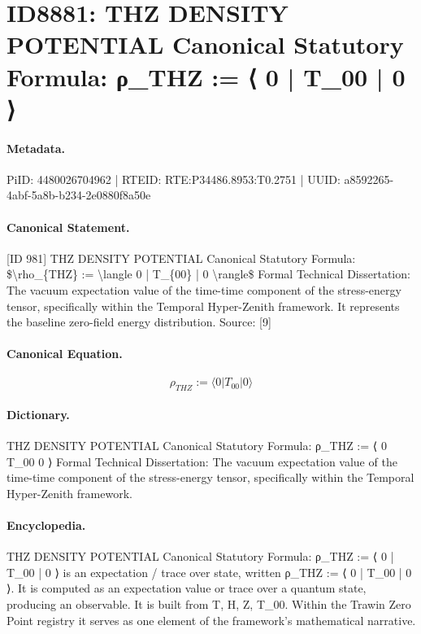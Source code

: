 \section*{ID8881: THZ DENSITY POTENTIAL Canonical Statutory Formula: ρ\_THZ := ⟨ 0 | T\_00 | 0 ⟩}
\paragraph{Metadata.}
PiID: 4480026704962 | RTEID: RTE:P34486.8953:T0.2751 | UUID: a8592265-4abf-5a8b-b234-2e0880f8a50e

\paragraph{Canonical Statement.}
[ID 981] THZ DENSITY POTENTIAL Canonical Statutory Formula: \$\textbackslash{}rho\_\{THZ\} := \textbackslash{}langle 0 | T\_\{00\} | 0 \textbackslash{}rangle\$ Formal Technical Dissertation: The vacuum expectation value of the time-time component of the stress-energy tensor, specifically within the Temporal Hyper-Zenith framework. It represents the baseline zero-field energy distribution. Source: [9]

\paragraph{Canonical Equation.}
\[
\rho_{THZ} := \langle 0 | T_{00} | 0 \rangle
\]

\paragraph{Dictionary.}
THZ DENSITY POTENTIAL Canonical Statutory Formula: ρ\_THZ := ⟨ 0 T\_00 0 ⟩ Formal Technical Dissertation: The vacuum expectation value of the time-time component of the stress-energy tensor, specifically within the Temporal Hyper-Zenith framework.

\paragraph{Encyclopedia.}
THZ DENSITY POTENTIAL Canonical Statutory Formula: ρ\_THZ := ⟨ 0 | T\_00 | 0 ⟩ is an expectation / trace over state, written ρ\_THZ := ⟨ 0 | T\_00 | 0 ⟩. It is computed as an expectation value or trace over a quantum state, producing an observable. It is built from T, H, Z, T\_00. Within the Trawin Zero Point registry it serves as one element of the framework's mathematical narrative.
